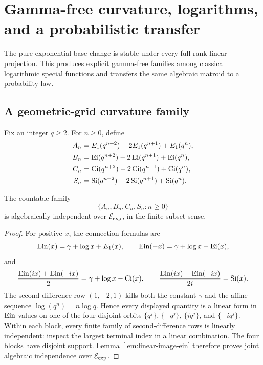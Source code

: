 \section{Gamma-free curvature, logarithms, and a probabilistic transfer}
\label{sec:crossfield-transfers}

The pure-exponential base change is stable under every full-rank linear
projection.  This produces explicit gamma-free families among classical
logarithmic special functions and transfers the same algebraic matroid to a
probability law.

\subsection{A geometric-grid curvature family}

Fix an integer \(q\ge2\).  For \(n\ge0\), define
\begin{align*}
 A_n&=E_1(q^{n+2})-2E_1(q^{n+1})+E_1(q^n),\\
 B_n&=\operatorname{Ei}(q^{n+2})-2\operatorname{Ei}(q^{n+1})+\operatorname{Ei}(q^n),\\
 C_n&=\operatorname{Ci}(q^{n+2})-2\operatorname{Ci}(q^{n+1})+\operatorname{Ci}(q^n),\\
 S_n&=\operatorname{Si}(q^{n+2})-2\operatorname{Si}(q^{n+1})+\operatorname{Si}(q^n).
\end{align*}

\begin{theorem}
\label{thm:geometric-curvature}
The countable family
\begin{equation}\label{eq:geometric-curvature-family}
 \{A_n,B_n,C_n,S_n:n\ge0\}
\end{equation}
is algebraically independent over \(\mathcal E_{\mathrm{exp}}\), in the finite-subset sense.
\end{theorem}

\begin{proof}
For positive \(x\), the connection formulas are
\[
 \operatorname{Ein}(x)=\gamma+\log x+E_1(x),\qquad
 \operatorname{Ein}(-x)=\gamma+\log x-\operatorname{Ei}(x),
\]
and
\[
 \frac{\operatorname{Ein}(ix)+\operatorname{Ein}(-ix)}2=\gamma+\log x-\operatorname{Ci}(x),
 \qquad
 \frac{\operatorname{Ein}(ix)-\operatorname{Ein}(-ix)}{2i}=\operatorname{Si}(x).
\]
The second-difference row \((1,-2,1)\) kills both the constant \(\gamma\)
and the affine sequence \(\log(q^n)=n\log q\).  Hence every displayed
quantity is a linear form in \(\operatorname{Ein}\)-values on one of the four disjoint
orbits \(\{q^j\}\), \(\{-q^j\}\), \(\{iq^j\}\), and \(\{-iq^j\}\).
Within each block, every finite family of second-difference rows is linearly
independent: inspect the largest terminal index in a linear combination.
The four blocks have disjoint support.  Lemma~\ref{lem:linear-image-ein}
therefore proves joint algebraic independence over \(\mathcal E_{\mathrm{exp}}\).
\end{proof}

